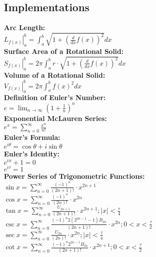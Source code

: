 \documentclass[12pt]{article}
\begin{document}
\subsection*{Implementations}
\textbf{Arc Length:}
    \\ \( \left. L_{f( x )} \right|_{a}^{b} = \displaystyle\int_{a}^{b} { \sqrt{ 1 + \left( \displaystyle\frac{ d }{ dx } f( x ) \right)^2 } dx } \)
\\ \textbf{Surface Area of a Rotational Solid:}
    \\ \( \left. S_{f( x )} \right|_{a}^{b} = 2 \pi \displaystyle\int_{a}^{b} { r \cdot \sqrt{ 1 + \left( \displaystyle\frac{ d }{ dx } f( x ) \right)^2 } dx } \)
\\ \textbf{Volume of a Rotational Solid:}
    \\ \( \left. V_{f( x )} \right|_{a}^{b} = 2 \pi \displaystyle\int_{a}^{b} { f( x )^2 dx } \)
\\ \textbf{Definition of Euler's Number:}
    \\ \( e = \displaystyle\lim_{n \rightarrow{\infty}} { \left( 1 + \displaystyle\frac{ 1 }{ n } \right)^n } \)
\\ \textbf{Exponential McLauren Series:}
    \\ \( e^x = \displaystyle\sum_{n = 0}^{\infty} { \displaystyle\frac{ x^n }{ n! } } \)
\\ \textbf{Euler's Formula:}
    \\ \( e^{i\theta} = \cos{\theta} + i\sin{\theta} \)
\\ \textbf{Euler's Identity:}
    \\ \( e^{i \pi} + 1 = 0 \)
    \\ \( e^{i\tau} = 1  \)
\\ \textbf{Power Series of Trigonometric Functions: }
    \\ \( \sin x = \displaystyle\sum_{n = 0}^{\infty} { \displaystyle\frac{ ( -1 )^n }{ ( 2n + 1 )! } \cdot x^{2n + 1} } \)
    \\ \( \cos x = \displaystyle\sum_{n = 0}^{\infty} { \displaystyle\frac{ ( -1 )^n }{ (2n)! } \cdot x^{2n} } \)
    \\ \( \tan x = \displaystyle\sum_{n = 0}^{\infty} { \displaystyle\frac{ U_{2n + 1} }{ ( 2n + 1 )! } \cdot x^{2n + 1} } ;  | x | < \displaystyle\frac{ \tau }{ 4 } \)
    \\ \( \csc x = \displaystyle\sum_{n = 0}^{\infty} { \displaystyle\frac{ ( -1 )^n 2( 2^{2n - 1} - 1 ) B_{2n} }{ ( 2n + 1 )! } \cdot x^{2n} } ; 0 < x < \displaystyle\frac{ \tau }{ 2 } \)
    \\ \( \sec x = \displaystyle\sum_{n = 0}^{\infty} { \displaystyle\frac{ U_{2n} }{ ( 2n )! } \cdot x^{2n} } ; | x | < \displaystyle\frac{ \tau }{ 4 } \)
    \\ \( \cot x = \displaystyle\sum_{n = 0}^{\infty} { \displaystyle\frac{ ( -1 )^n 2^{2n - 1} B_{2n} }{ ( 2n + 1 )! } \cdot x^{2n + 1} } ; 0 < x < \displaystyle\frac{ \tau }{ 2 } \)
\end{document}
